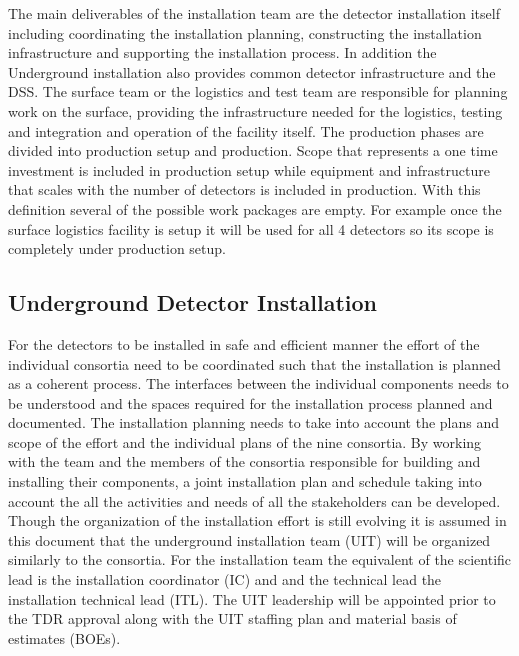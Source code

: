 The main deliverables of the installation team are the
detector installation itself including coordinating the installation
planning, constructing the installation infrastructure and supporting
the installation process. In addition the Underground installation
also provides common detector infrastructure and the DSS. The surface
team or the logistics and test team are responsible for planning
 work on the surface, providing the infrastructure needed
for the logistics, testing and integration and operation of the
facility itself. The  production phases are divided into
production setup and production. Scope that represents a one time
investment is included in production setup while equipment and
infrastructure that scales with the number of detectors is included in
production. With this definition several of the possible work packages
are empty. For example once the surface logistics facility is setup it
will be used for all \num{4} detectors so its scope is completely under
production setup.







\subsection{Underground Detector Installation}
\label{sec:fdsp-coord-undergd}

For the  detectors to be installed in safe and efficient
manner the effort of the individual consortia need to be coordinated
such that the installation is planned as a coherent process. The
interfaces between the individual components needs to be understood
and the spaces required for the installation process planned and
documented. The installation planning needs to take into account the
plans and scope of the  effort and the individual plans of
the nine consortia. By working with the  team and the
members of the consortia responsible for building and installing their
components, a joint installation plan and schedule taking into account
the all the activities and needs of all the stakeholders can be
developed. Though the organization of the installation effort is still
evolving it is assumed in this document that the underground
installation team (UIT) will be organized similarly to the
consortia. For the installation team the equivalent of the scientific
lead is the installation coordinator (IC) and and the technical lead
the installation technical lead (ITL). The UIT leadership will be
appointed prior to the TDR approval along with the UIT staffing plan
and material basis of estimates (BOEs).

